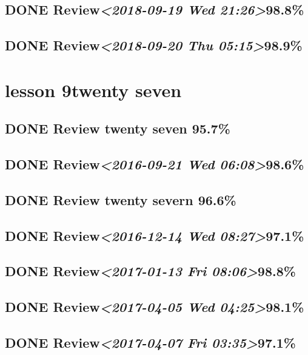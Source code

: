 \documentclass[11pt]{ctexart}
\begin{document}
\subsection{{\bfseries\sffamily DONE} Review\textit{<2018-09-19 Wed 21:26>}98.8\%}
\label{sec:orgd54badb}
\subsection{{\bfseries\sffamily DONE} Review\textit{<2018-09-20 Thu 05:15>}98.9\%}
\label{sec:org4089934}
\section{lesson 9twenty seven}
\label{sec:org9ce6b98}
\subsection{{\bfseries\sffamily DONE} Review twenty seven 95.7\%}
\label{sec:orgbc24ec9}

\subsection{{\bfseries\sffamily DONE} Review\textit{<2016-09-21 Wed 06:08>}98.6\%}
\label{sec:org0042b34}
\subsection{{\bfseries\sffamily DONE} Review twenty severn 96.6\%}
\label{sec:orgcb74e8e}

\subsection{{\bfseries\sffamily DONE} Review\textit{<2016-12-14 Wed 08:27>}97.1\%}
\label{sec:org0e639e6}
\subsection{{\bfseries\sffamily DONE} Review\textit{<2017-01-13 Fri 08:06>}98.8\%}
\label{sec:org56cbcd8}
\subsection{{\bfseries\sffamily DONE} Review\textit{<2017-04-05 Wed 04:25>}98.1\%}
\label{sec:orgfd8a57c}
\subsection{{\bfseries\sffamily DONE} Review\textit{<2017-04-07 Fri 03:35>}97.1\%}
\label{sec:org889db60}
\end{document}
